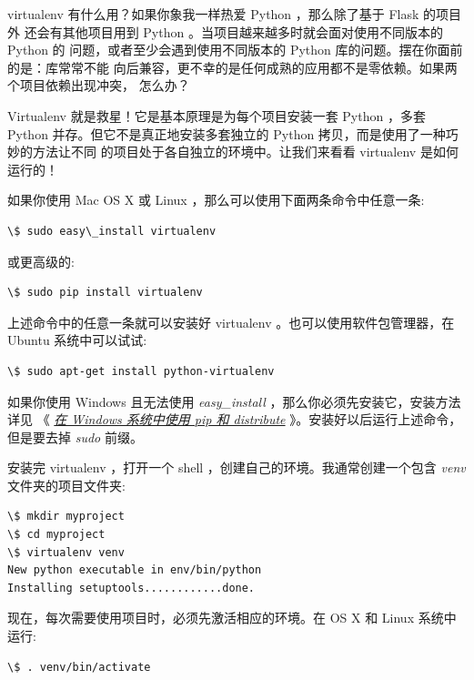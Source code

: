 \documentclass[a4paper,12pt]{sphinxmanual}
\begin{document}
virtualenv 有什么用？如果你象我一样热爱 Python ，那么除了基于 Flask 的项目外
还会有其他项目用到 Python 。当项目越来越多时就会面对使用不同版本的 Python 的
问题，或者至少会遇到使用不同版本的 Python 库的问题。摆在你面前的是：库常常不能
向后兼容，更不幸的是任何成熟的应用都不是零依赖。如果两个项目依赖出现冲突，
怎么办？

Virtualenv 就是救星！它是基本原理是为每个项目安装一套 Python ，多套 Python
并存。但它不是真正地安装多套独立的 Python 拷贝，而是使用了一种巧妙的方法让不同
的项目处于各自独立的环境中。让我们来看看 virtualenv 是如何运行的！

如果你使用 Mac OS X 或 Linux ，那么可以使用下面两条命令中任意一条:

\begin{Verbatim}[commandchars=\\\{\}]
\$ sudo easy\_install virtualenv
\end{Verbatim}

或更高级的:

\begin{Verbatim}[commandchars=\\\{\}]
\$ sudo pip install virtualenv
\end{Verbatim}

上述命令中的任意一条就可以安装好 virtualenv 。也可以使用软件包管理器，在
Ubuntu 系统中可以试试:

\begin{Verbatim}[commandchars=\\\{\}]
\$ sudo apt-get install python-virtualenv
\end{Verbatim}

如果你使用 Windows 且无法使用 \emph{easy\_install} ，那么你必须先安装它，安装方法详见
《 {\hyperref[installation:windows-easy-install]{\emph{在 Windows 系统中使用 pip 和 distribute}}} 》。安装好以后运行上述命令，但是要去掉 \emph{sudo}
前缀。

安装完 virtualenv ，打开一个 shell ，创建自己的环境。我通常创建一个包含 \emph{venv}
文件夹的项目文件夹:

\begin{Verbatim}[commandchars=\\\{\}]
\$ mkdir myproject
\$ cd myproject
\$ virtualenv venv
New python executable in env/bin/python
Installing setuptools............done.
\end{Verbatim}

现在，每次需要使用项目时，必须先激活相应的环境。在 OS X 和 Linux 系统中运行:

\begin{Verbatim}[commandchars=\\\{\}]
\$ . venv/bin/activate
\end{Verbatim}
\end{document}
